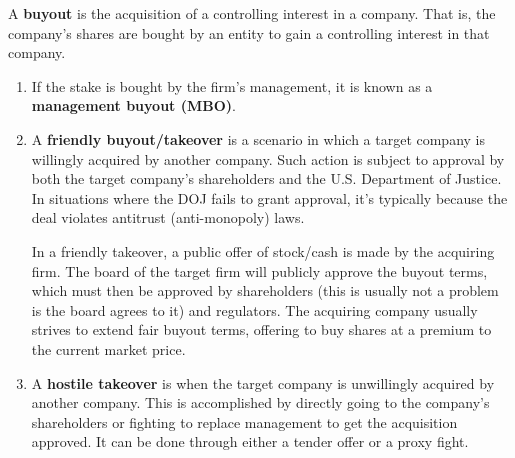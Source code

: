 \documentclass{article}
\begin{document}
    \begin{definition}[Buyout]
      \label{def:buyout}
      A \textbf{buyout} is the acquisition of a controlling interest in a company. That is, the company's shares are bought by an entity to gain a controlling interest in that company.  
      \begin{enumerate}
        \item If the stake is bought by the firm's management, it is known as a \textbf{management buyout (MBO)}.

        \item A \textbf{friendly buyout/takeover} is a scenario in which a target company is willingly acquired by another company. Such action is subject to approval by both the target company's shareholders and the U.S. Department of Justice. In situations where the DOJ fails to grant approval, it's typically because the deal violates antitrust (anti-monopoly) laws. 
        
        In a friendly takeover, a public offer of stock/cash is made by the acquiring firm. The board of the target firm will publicly approve the buyout terms, which must then be approved by shareholders (this is usually not a problem is the board agrees to it) and regulators. The acquiring company usually strives to extend fair buyout terms, offering to buy shares at a premium to the current market price.

        \item A \textbf{hostile takeover} is when the target company is unwillingly acquired by another company. This is accomplished by directly going to the company's shareholders or fighting to replace management to get the acquisition approved. It can be done through either a tender offer or a proxy fight. 
      \end{enumerate}
    \end{definition}
\end{document}

